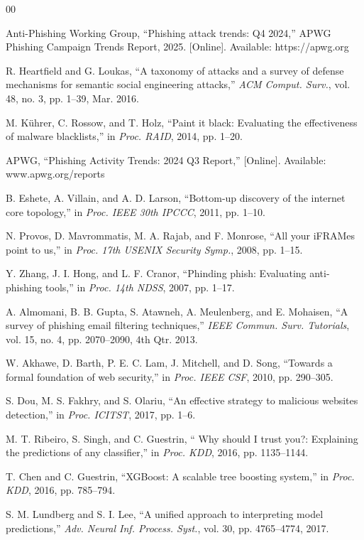 \documentclass[conference]{IEEEtran}
\begin{document}
\begin{thebibliography}{00}

 Anti-Phishing Working Group, ``Phishing attack trends: Q4 2024,'' APWG Phishing Campaign Trends Report, 2025. [Online]. Available: https://apwg.org

 R. Heartfield and G. Loukas, ``A taxonomy of attacks and a survey of defense mechanisms for semantic social engineering attacks,'' \textit{ACM Comput. Surv.}, vol. 48, no. 3, pp. 1--39, Mar. 2016.

 M. Kührer, C. Rossow, and T. Holz, ``Paint it black: Evaluating the effectiveness of malware blacklists,'' in \textit{Proc. RAID}, 2014, pp. 1--20.

 APWG, ``Phishing Activity Trends: 2024 Q3 Report,'' [Online]. Available: www.apwg.org/reports

 B. Eshete, A. Villain, and A. D. Larson, ``Bottom-up discovery of the internet core topology,'' in \textit{Proc. IEEE 30th IPCCC}, 2011, pp. 1--10.

 N. Provos, D. Mavrommatis, M. A. Rajab, and F. Monrose, ``All your iFRAMes point to us,'' in \textit{Proc. 17th USENIX Security Symp.}, 2008, pp. 1--15.

 Y. Zhang, J. I. Hong, and L. F. Cranor, ``Phinding phish: Evaluating anti-phishing tools,'' in \textit{Proc. 14th NDSS}, 2007, pp. 1--17.

 A. Almomani, B. B. Gupta, S. Atawneh, A. Meulenberg, and E. Mohaisen, ``A survey of phishing email filtering techniques,'' \textit{IEEE Commun. Surv. Tutorials}, vol. 15, no. 4, pp. 2070--2090, 4th Qtr. 2013.

 W. Akhawe, D. Barth, P. E. C. Lam, J. Mitchell, and D. Song, ``Towards a formal foundation of web security,'' in \textit{Proc. IEEE CSF}, 2010, pp. 290--305.

 S. Dou, M. S. Fakhry, and S. Olariu, ``An effective strategy to malicious websites detection,'' in \textit{Proc. ICITST}, 2017, pp. 1--6.

 M. T. Ribeiro, S. Singh, and C. Guestrin, `` Why should I trust you?: Explaining the predictions of any classifier,'' in \textit{Proc. KDD}, 2016, pp. 1135--1144.

 T. Chen and C. Guestrin, ``XGBoost: A scalable tree boosting system,'' in \textit{Proc. KDD}, 2016, pp. 785--794.

 S. M. Lundberg and S. I. Lee, ``A unified approach to interpreting model predictions,'' \textit{Adv. Neural Inf. Process. Syst.}, vol. 30, pp. 4765--4774, 2017.


\end{thebibliography}
\end{document}
